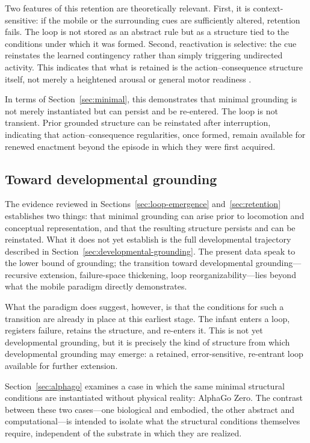 \documentclass[11pt]{article}
\begin{document}
Two features of this retention are theoretically relevant. First, it
is context-sensitive: if the mobile or the surrounding cues are
sufficiently altered, retention fails. The loop is not stored as an
abstract rule but as a structure tied to the conditions under which it
was formed. Second, reactivation is selective: the cue reinstates the
learned contingency rather than simply triggering undirected activity.
This indicates that what is retained is the action--consequence
structure itself, not merely a heightened arousal or general motor
readiness \citep{RoveeCollier1997}.

In terms of Section~\ref{sec:minimal}, this demonstrates that minimal
grounding is not merely instantiated but can persist and be
re-entered. The loop is not transient. Prior grounded structure can be
reinstated after interruption, indicating that action--consequence
regularities, once formed, remain available for renewed enactment
beyond the episode in which they were first acquired.

\subsection{Toward developmental grounding}
\label{sec:toward-dev}

The evidence reviewed in Sections~\ref{sec:loop-emergence}
and~\ref{sec:retention} establishes two things: that minimal grounding
can arise prior to locomotion and conceptual representation, and that
the resulting structure persists and can be reinstated. What it does
not yet establish is the full developmental trajectory described in
Section~\ref{sec:developmental-grounding}. The present data speak to
the lower bound of grounding; the transition toward developmental
grounding---recursive extension, failure-space thickening, loop
reorganizability---lies beyond what the mobile paradigm directly
demonstrates.

What the paradigm does suggest, however, is that the conditions for
such a transition are already in place at this earliest stage. The
infant enters a loop, registers failure, retains the structure, and
re-enters it. This is not yet developmental grounding, but it is
precisely the kind of structure from which developmental grounding may
emerge: a retained, error-sensitive, re-entrant loop available for
further extension.

Section~\ref{sec:alphago} examines a case in which the same minimal
structural conditions are instantiated without physical reality:
AlphaGo Zero. The contrast between these two cases---one biological
and embodied, the other abstract and computational---is intended to
isolate what the structural conditions themselves require, independent
of the substrate in which they are realized.
\end{document}
